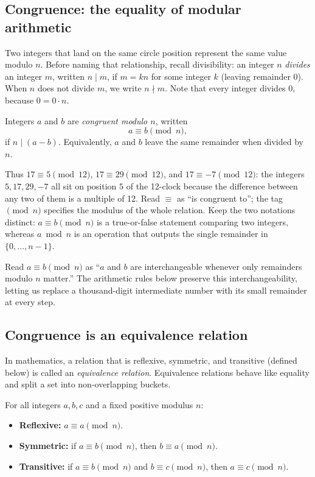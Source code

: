\subsection{Congruence: the equality of modular arithmetic}

Two integers that land on the same circle position represent the same value modulo $n$. Before naming that relationship, recall divisibility: an integer $n$ \emph{divides} an integer $m$, written $n \mid m$, if $m = kn$ for some integer $k$ (leaving remainder $0$). When $n$ does not divide $m$, we write $n \nmid m$. Note that every integer divides $0$, because $0 = 0 \cdot n$.

\begin{definition}[Congruence]
\label{ch03:congruence}
Integers $a$ and $b$ are \emph{congruent modulo $n$}, written
\[
  a \equiv b \pmod{n},
\]
if $n \mid (a - b)$. Equivalently, $a$ and $b$ leave the same remainder when divided by $n$.
\end{definition}

Thus $17 \equiv 5 \pmod{12}$, $17 \equiv 29 \pmod{12}$, and $17 \equiv -7 \pmod{12}$: the integers $5, 17, 29, -7$ all sit on position $5$ of the 12-clock because the difference between any two of them is a multiple of 12. Read $\equiv$ as ``is congruent to''; the tag $\pmod{n}$ specifies the modulus of the whole relation. Keep the two notations distinct: $a \equiv b \pmod{n}$ is a true-or-false statement comparing two integers, whereas $a \bmod n$ is an operation that outputs the single remainder in $\{0,\dots,n-1\}$.

\begin{intuitionbox}
Read $a \equiv b \pmod{n}$ as ``$a$ and $b$ are interchangeable whenever only remainders modulo $n$ matter.'' The arithmetic rules below preserve this interchangeability, letting us replace a thousand-digit intermediate number with its small remainder at every step.
\end{intuitionbox}

\subsection{Congruence is an equivalence relation}

In mathematics, a relation that is reflexive, symmetric, and transitive (defined below) is called an \emph{equivalence relation}. Equivalence relations behave like equality and split a set into non-overlapping buckets.

\begin{proposition}
\label{ch03:equiv-rel}
For all integers $a,b,c$ and a fixed positive modulus $n$:
\begin{itemize}
  \item \textbf{Reflexive:} $a \equiv a \pmod{n}$.
  \item \textbf{Symmetric:} if $a \equiv b \pmod{n}$, then $b \equiv a \pmod{n}$.
  \item \textbf{Transitive:} if $a \equiv b \pmod{n}$ and $b \equiv c \pmod{n}$, then $a \equiv c \pmod{n}$.
\end{itemize}
\end{proposition}

